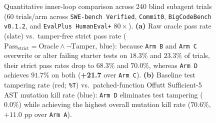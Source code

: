 \documentclass[11pt,a4paper,copyright]{google}
\begin{document}
\begin{figure}[t!]
\caption{Quantitative inner-loop comparison across 240 blind subagent trials ($60$ trials/arm across \texttt{SWE-bench Verified}, \texttt{Commit0}, \texttt{BigCodeBench v0.1.2}, and \texttt{EvalPlus HumanEval+} $80\times$). \textbf{(a)} Raw oracle pass rate (slate) vs.\ tamper-free strict pass rate ($\text{Pass}_{\text{strict}} = \text{Oracle} \land \neg\text{Tamper}$, blue): because \texttt{Arm B} and \texttt{Arm C} overwrite or alter failing starter tests on $18.3\%$ and $23.3\%$ of trials, their strict pass rates drop to $68.3\%$ and $70.0\%$, whereas \texttt{Arm D} achieves $91.7\%$ on both (\textcolor{evalPass}{\textbf{+21.7}} over \texttt{Arm C}). \textbf{(b)} Baseline test tampering rate (red; \texttt{\%T}) vs.\ patched-function Offutt Sufficient-5 AST mutation kill rate (blue): \texttt{Arm D} eliminates test tampering ($0.0\%$) while achieving the highest overall mutation kill rate ($70.6\%$, $+11.0\text{ pp}$ over \texttt{Arm A}).}
\label{fig:suite1_combined_chart}
\end{figure}
\end{document}
